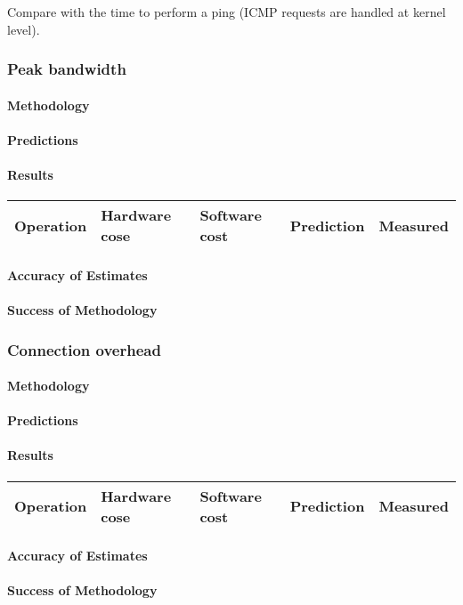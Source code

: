  Compare with the time to perform a ping (ICMP requests are handled at kernel level).






\subsubsection{Peak bandwidth}



\paragraph{Methodology}
\paragraph{Predictions}
\paragraph{Results}

\begin{center}
\begin{tabular}{| l | l | l | l | l |}
\hline
Operation & Hardware cose & Software cost & Prediction & Measured \\
\hline
\end{tabular}
\end{center}

\paragraph{Accuracy of Estimates}
\paragraph{Success of Methodology}





\subsubsection{Connection overhead}
\paragraph{Methodology}
\paragraph{Predictions}
\paragraph{Results}

\begin{center}
\begin{tabular}{| l | l | l | l | l |}
\hline
Operation & Hardware cose & Software cost & Prediction & Measured \\
\hline
\end{tabular}
\end{center}

\paragraph{Accuracy of Estimates}
\paragraph{Success of Methodology}
